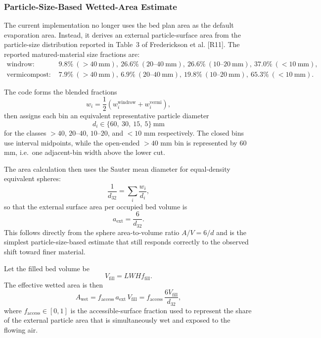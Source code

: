 \documentclass{article}
\begin{document}
\subsubsection{Particle-Size-Based Wetted-Area Estimate}

The current implementation no longer uses the bed plan area as the default
evaporation area. Instead, it derives an external particle-surface area from
the particle-size distribution reported in Table~3 of Frederickson et al.
[R11]. The reported matured-material size fractions are:
\begin{align}
\text{windrow: } &
9.8\% \ (>40\ \mathrm{mm}),\ 
26.6\% \ (20\text{--}40\ \mathrm{mm}),\ 
26.6\% \ (10\text{--}20\ \mathrm{mm}),\ 
37.0\% \ (<10\ \mathrm{mm}),\\
\text{vermicompost: } &
7.9\% \ (>40\ \mathrm{mm}),\ 
6.9\% \ (20\text{--}40\ \mathrm{mm}),\ 
19.8\% \ (10\text{--}20\ \mathrm{mm}),\ 
65.3\% \ (<10\ \mathrm{mm}).
\end{align}

The code forms the blended fractions
\begin{equation}
w_i = \frac{1}{2}\left(w_i^{\mathrm{windrow}} + w_i^{\mathrm{vermi}}\right),
\end{equation}
then assigns each bin an equivalent representative particle diameter
\begin{equation}
d_i \in \{60,\ 30,\ 15,\ 5\}\ \mathrm{mm}
\end{equation}
for the classes $>40$, $20$--$40$, $10$--$20$, and $<10$ mm respectively.
The closed bins use interval midpoints, while the open-ended $>40$ mm bin is
represented by $60$ mm, i.e.\ one adjacent-bin width above the lower cut.

The area calculation then uses the Sauter mean diameter for equal-density
equivalent spheres:
\begin{equation}
\frac{1}{d_{32}} = \sum_i \frac{w_i}{d_i},
\end{equation}
so that the external surface area per occupied bed volume is
\begin{equation}
a_{\mathrm{ext}} = \frac{6}{d_{32}}.
\end{equation}
This follows directly from the sphere area-to-volume ratio $A/V=6/d$ and is
the simplest particle-size-based estimate that still responds correctly to the
observed shift toward finer material.

Let the filled bed volume be
\begin{equation}
V_{\mathrm{fill}} = LWH f_{\mathrm{fill}}.
\end{equation}
The effective wetted area is then
\begin{equation}
A_{\mathrm{wet}} = f_{\mathrm{access}}\,a_{\mathrm{ext}}\,V_{\mathrm{fill}}
= f_{\mathrm{access}}\,\frac{6V_{\mathrm{fill}}}{d_{32}},
\end{equation}
where $f_{\mathrm{access}} \in [0,1]$ is the accessible-surface fraction used
to represent the share of the external particle area that is simultaneously
wet and exposed to the flowing air.
\end{document}
